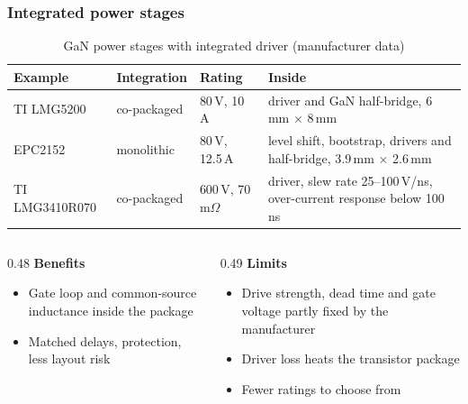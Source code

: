 \begin{frame}
	\frametitle{Integrated power stages}
	\begin{table}
		\centering
		\footnotesize
		\begin{tabular}{|l|l|l|>{\raggedright\arraybackslash}p{6.4cm}|}
			\hline
			\textbf{Example} & \textbf{Integration} & \textbf{Rating}       & \textbf{Inside}                                                         \\
			\hline
			TI LMG5200       & co-packaged          & 80\,V, 10\,A          & driver and GaN half-bridge, 6\,mm $\times$ 8\,mm                        \\
			EPC2152          & monolithic           & 80\,V, 12.5\,A        & level shift, bootstrap, drivers and half-bridge, 3.9\,mm $\times$ 2.6\,mm \\
			TI LMG3410R070   & co-packaged          & 600\,V, 70\,m$\Omega$ & driver, slew rate 25--100\,V/ns, over-current response below 100\,ns    \\
			\hline
		\end{tabular}
		\caption{GaN power stages with integrated driver (manufacturer data)}
	\end{table}
	\begin{columns}[T]
		\begin{column}{0.48\textwidth}
			\small
			\textbf{Benefits}
			\begin{itemize}
				\item Gate loop and common-source inductance inside the package
				\item Matched delays, protection, less layout risk
			\end{itemize}
		\end{column}
		\begin{column}{0.49\textwidth}
			\small
			\textbf{Limits}
			\begin{itemize}
				\item Drive strength, dead time and gate voltage partly fixed by the manufacturer
				\item Driver loss heats the transistor package
				\item Fewer ratings to choose from
			\end{itemize}
		\end{column}
	\end{columns}
\end{frame}

